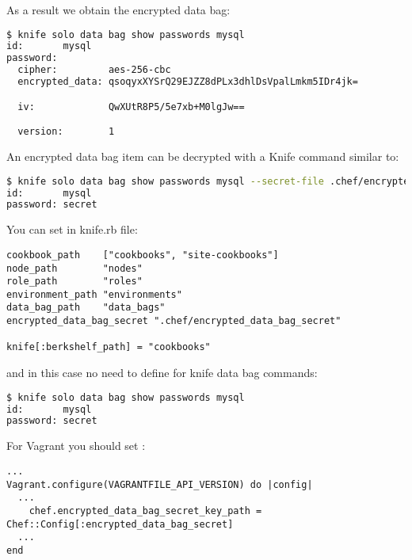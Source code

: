 As a result we obtain the encrypted data bag:

\begin{lstlisting}[language=Bash,label=lst:my-cloud-chef-databag7]
$ knife solo data bag show passwords mysql
id:       mysql
password:
  cipher:         aes-256-cbc
  encrypted_data: qsoqyxXYSrQ29EJZZ8dPLx3dhlDsVpalLmkm5IDr4jk=

  iv:             QwXUtR8P5/5e7xb+M0lgJw==

  version:        1
\end{lstlisting}

An encrypted data bag item can be decrypted with a Knife command similar to:

\begin{lstlisting}[language=Bash,label=lst:my-cloud-chef-databag8,title=my-cloud/Gemfile]
$ knife solo data bag show passwords mysql --secret-file .chef/encrypted_data_bag_secret
id:       mysql
password: secret
\end{lstlisting}

You can set  in knife.rb file:

\begin{lstlisting}[label=lst:my-cloud-chef-databag9,title=my-cloud/.chef/knife.rb]
cookbook_path    ["cookbooks", "site-cookbooks"]
node_path        "nodes"
role_path        "roles"
environment_path "environments"
data_bag_path    "data_bags"
encrypted_data_bag_secret ".chef/encrypted_data_bag_secret"

knife[:berkshelf_path] = "cookbooks"
\end{lstlisting}

and in this case no need to define  for knife data bag commands:

\begin{lstlisting}[language=Bash,label=lst:my-cloud-chef-databag11]
$ knife solo data bag show passwords mysql
id:       mysql
password: secret
\end{lstlisting}

For Vagrant you should set :

\begin{lstlisting}[label=lst:my-cloud-chef-databag12,title=my-cloud/Vagrantfile]
...
Vagrant.configure(VAGRANTFILE_API_VERSION) do |config|
  ...
    chef.encrypted_data_bag_secret_key_path = Chef::Config[:encrypted_data_bag_secret]
  ...
end
\end{lstlisting}

